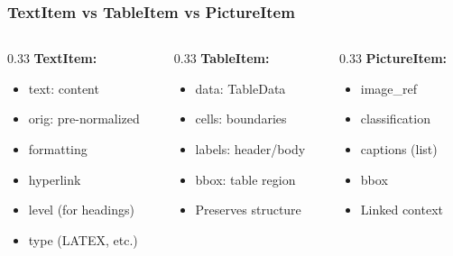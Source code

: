 \begin{frame}[fragile]\frametitle{TextItem vs TableItem vs PictureItem}
\begin{columns}
    \begin{column}[T]{0.33\linewidth}
      \textbf{TextItem:}
      \begin{itemize}
        \item text: content
        \item orig: pre-normalized
        \item formatting
        \item hyperlink
        \item level (for headings)
        \item type (LATEX, etc.)
      \end{itemize}
    \end{column}
    \begin{column}[T]{0.33\linewidth}
      \textbf{TableItem:}
      \begin{itemize}
        \item data: TableData
        \item cells: boundaries
        \item labels: header/body
        \item bbox: table region
        \item Preserves structure
      \end{itemize}
    \end{column}
    \begin{column}[T]{0.33\linewidth}
      \textbf{PictureItem:}
      \begin{itemize}
        \item image\_ref
        \item classification
        \item captions (list)
        \item bbox
        \item Linked context
      \end{itemize}
    \end{column}
  \end{columns}
\end{frame}

